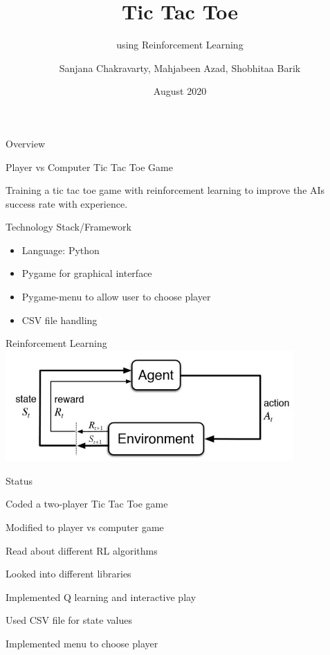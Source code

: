 \documentclass[14pt]{beamer}
\title[WTEF 2020]{Tic Tac Toe}
\subtitle{using Reinforcement Learning}
\author[Group 12]{Sanjana Chakravarty, Mahjabeen Azad, Shobhitaa Barik}
\date{August 2020}
\begin{document}
\begin{frame}
    \titlepage
\end{frame}

\begin{frame}{Overview}
    \begin{center}
        \textcolor{myAmber}{Player vs Computer Tic Tac Toe Game}
    \end{center}
   
    \begin{center}
    Training a tic tac toe game with reinforcement learning to improve the AI\textquotesingle s success rate with experience.
    \end{center}
\end{frame}

\begin{frame}{Technology Stack/Framework}
        \begin{itemize}
            \item Language: Python
            \item Pygame for graphical interface 
            \item Pygame-menu to allow user to choose player
            \item CSV file handling
        \end{itemize}
\end{frame}

\begin{frame}{Reinforcement Learning}
    \includegraphics[width=110mm]{RL.jpg}
\end{frame}

\begin{frame}{Status}
    \begin{description}[STATUS]
        \item[\color{myPink}{24 Jun 2020}] Coded a two-player Tic Tac Toe game
        \item[\color{myPink}{27 Jun 2020}] Modified to player vs computer game
        \item[\color{myPink}{29 Jun 2020}] Read about different RL algorithms
        \item[\color{myPink}{04 Jul 2020}] Looked into different libraries
        \item[\color{myPink}{11 Jul 2020}] Implemented Q learning and interactive play
        \item[\color{myPink}{12 Jul 2020}] Used CSV file for state values
        \item[\color{myPink}{10 Aug 2020}] Implemented menu to choose player
    \end{description}
\end{frame}
\end{document}

